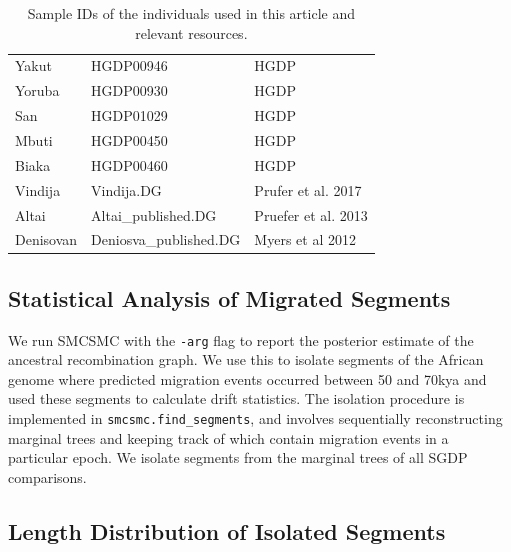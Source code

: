 \begin{table}[ht]
\begin{tabular}{lll}
      Yakut & HGDP00946 & HGDP \\ 
      Yoruba & HGDP00930 & HGDP \\ 
      San & HGDP01029 & HGDP \\ 
      Mbuti & HGDP00450 & HGDP \\ 
      Biaka & HGDP00460 & HGDP \\ 
      Vindija & Vindija.DG & Prufer et al. 2017 \\ 
      Altai & Altai\_published.DG & Pruefer et al. 2013 \\ 
      Denisovan & Deniosva\_published.DG & Myers et al 2012 \\ 
       \hline
    \end{tabular}
    \caption[Sample identifiers]{Sample IDs of the individuals used in this article and relevant resources.} 
    \label{samples}
    \end{table}
    

    \subsection{Statistical Analysis of Migrated Segments} \label{dstats_section}

    We run SMCSMC with the {\tt -arg} flag to report the posterior estimate of the ancestral recombination graph. We use this to isolate segments of the African genome where predicted migration events occurred between 50 and 70kya and used these segments to calculate drift statistics. The isolation procedure is implemented in {\tt smcsmc.find\_segments}, and involves sequentially reconstructing marginal trees and keeping track of which contain migration events in a particular epoch. We isolate segments from the marginal trees of all SGDP comparisons. 

\subsection{Length Distribution of Isolated Segments}


